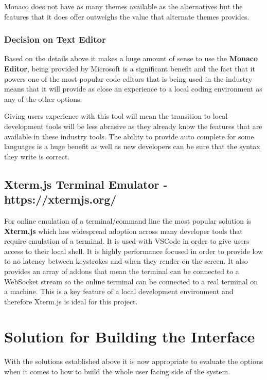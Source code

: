 Monaco does not have as many themes available as the alternatives but the features that it does offer outweighs the value that alternate themes provides.

\subsubsection{Decision on Text Editor}

Based on the details above it makes a huge amount of sense to use the \textbf{Monaco Editor}, being provided by Microsoft is a significant benefit and the fact that it powers one of the most popular code editors that is being used in the industry means that it will provide as close an experience to a local coding environment as any of the other options.

Giving users experience with this tool will mean the transition to local development tools will be less abrasive as they already know the features that are available in these industry tools. The ability to provide auto complete for some languages is a huge benefit as well as new developers can be sure that the syntax they write is correct.

\subsection{Xterm.js Terminal Emulator - https://xtermjs.org/}

For online emulation of a terminal/command line the most popular solution is \textbf{Xterm.js} which has widespread adoption across many developer tools that require emulation of a terminal. It is used with VSCode in order to give users access to their local shell. It is highly performance focused in order to provide low to no latency between keystrokes and when they render on the screen. It also provides an array of addons that mean the terminal can be connected to a WebSocket stream so the online terminal can be connected to a real terminal on a machine. This is a key feature of a local development environment and therefore Xterm.js is ideal for this project.

\section{Solution for Building the Interface} \label{solapp-tools}

With the solutions established above it is now appropriate to evaluate the options when it comes to how to build the whole user facing side of the system.

